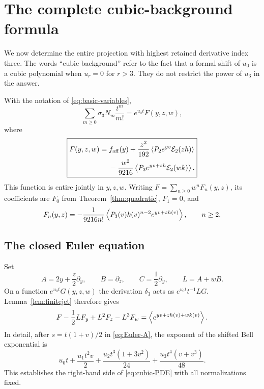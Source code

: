 \clearpage
\section{The complete cubic-background formula}
\label{sec:cubic}

We now determine the entire projection with highest retained derivative
index three. The words ``cubic background'' refer to the fact that a
formal shift of $u_0$ is a cubic polynomial when $u_r=0$ for $r>3$.
They do not restrict the power of $u_3$ in the answer.

\begin{theorem}\label{thm:main}
With the notation of \eqref{eq:basic-variables},
\begin{equation}\label{eq:main-generating}
 \sum_{m\ge0}\sigma_3N_m\frac{t^m}{m!}=e^{u_0t}F(y,z,w),
\end{equation}
where
\begin{equation}\label{eq:main}
\boxed{\begin{aligned}
 F(y,z,w)={}&f_{\mathrm{aff}}(y)
 +\frac{z^2}{192}\left\langle P_2e^{yv}\mathcal E_2(zh)\right\rangle\\
 &-\frac{w^2}{9216}\left\langle P_3e^{yv+zh}\mathcal E_2(wk)\right\rangle.
\end{aligned}}
\end{equation}
This function is entire jointly in $y,z,w$. Writing
$F=\sum_{n\ge0}w^nF_n(y,z)$, its coefficients are $F_0$ from
Theorem~\ref{thm:quadratic}, $F_1=0$, and
\begin{equation}\label{eq:Fn-density}
 F_n(y,z)=-\frac1{9216n!}
 \left\langle P_3(v)k(v)^{n-2}e^{yv+zh(v)}\right\rangle,\qquad n\ge2.
\end{equation}
\end{theorem}

\subsection{The closed Euler equation}
Set
\[
 A=2y+\frac z2\partial_y,\qquad B=\partial_z,\qquad
 C=\frac12\partial_y,\qquad L=A+wB.
\]
On a function $e^{u_0t}G(y,z,w)$ the derivation $\delta_3$ acts as
$e^{u_0t}t^{-1}LG$. Lemma~\ref{lem:finitejet} therefore gives
\begin{equation}\label{eq:cubic-PDE}
 F-\frac12L F_y+L^2F_z-L^3F_w
 =\left\langle e^{yv+zh(v)+wk(v)}\right\rangle.
\end{equation}
In detail, after $s=t(1+v)/2$ in \eqref{eq:Euler-A}, the exponent of
the shifted Bell exponential is
\[
 u_0t+\frac{u_1t^2v}{2}
 +\frac{u_2t^3(1+3v^2)}{24}
 +\frac{u_3t^4(v+v^3)}{48}.
\]
This establishes the right-hand side of \eqref{eq:cubic-PDE} with all
normalizations fixed.

